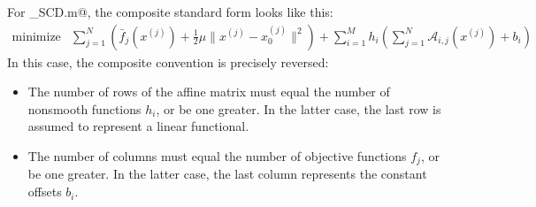 \documentclass{article}
\newcommand{\cA}{\ensuremath{\mathcal{A}}}    %
\newcommand\thalf{{\textstyle\frac{1}{2}}}
\newcommand{\<}{\langle}
\renewcommand{\>}{\rangle}
\begin{document}
For \verb@tfocs_SCD.m@, the composite standard form looks like this:
\begin{equation}
	\label{eq:comp-scd}
	\begin{array}{ll}
		\text{minimize} &  \sum_{j=1}^N \left( \bar{f}_j(x^{(j)}) + \thalf \mu \| x^{(j)} - x_0^{(j)} \|^2 \right) + \sum_{i=1}^M h_i(\sum_{j=1}^N \cA_{i,j}(x^{(j)})+b_i)
	\end{array}		
\end{equation}
In this case, the composite convention is precisely reversed:
\begin{itemize}
\item The number of rows of the affine matrix must equal the number of
nonsmooth functions $h_i$, or be one greater. In the latter case, the
last row is assumed to represent a linear functional.
\item The number of columns must equal the number of objective
functions $f_j$, or be one greater. In the latter case, the last
column represents the constant offsets $b_i$.
\end{itemize}
\end{document}
